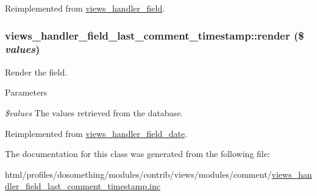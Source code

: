 Reimplemented from \hyperlink{classviews__handler__field_a3d50050864c255b71c842972a45d39f6}{views\_\-handler\_\-field}.\hypertarget{classviews__handler__field__last__comment__timestamp_ac11bf8393ddb71cd12771cb8b516876a}{
\subsubsection[{render}]{\setlength{\rightskip}{0pt plus 5cm}views\_\-handler\_\-field\_\-last\_\-comment\_\-timestamp::render (\$ {\em values})}}
\label{classviews__handler__field__last__comment__timestamp_ac11bf8393ddb71cd12771cb8b516876a}
Render the field.


\begin{DoxyParams}{Parameters}
\item[{\em \$values}]The values retrieved from the database. \end{DoxyParams}


Reimplemented from \hyperlink{classviews__handler__field__date_a4ed821df9270dc90bd3c2103d7136d47}{views\_\-handler\_\-field\_\-date}.

The documentation for this class was generated from the following file:\begin{DoxyCompactItemize}
\item 
html/profiles/dosomething/modules/contrib/views/modules/comment/\hyperlink{views__handler__field__last__comment__timestamp_8inc}{views\_\-handler\_\-field\_\-last\_\-comment\_\-timestamp.inc}\end{DoxyCompactItemize}
